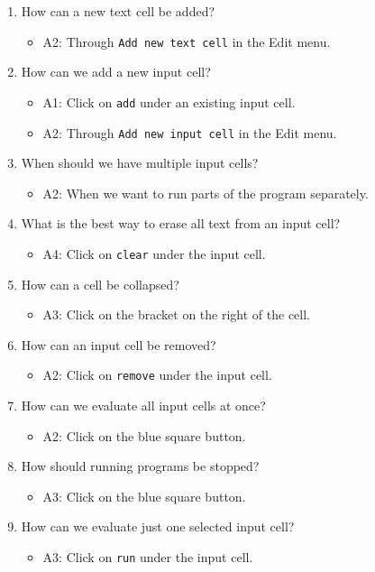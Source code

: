 \documentclass[article,A4,12pt]{llncs}
\begin{document}
\begin{enumerate}
\item How can a new text cell be added?
  \begin{itemize}
    \item A2: Through {\tt Add new text cell} in the Edit menu.
  \end{itemize}
\item How can we add a new input cell?
  \begin{itemize}
    \item A1: Click on {\tt add} under an existing input cell.
    \item A2: Through {\tt Add new input cell} in the Edit menu.
  \end{itemize}
\item When should we have multiple input cells?
  \begin{itemize}
    \item A2: When we want to run parts of the program separately.
  \end{itemize}
\item What is the best way to erase all text from an input cell?
  \begin{itemize}
    \item A4: Click on {\tt clear} under the input cell.
  \end{itemize}
\item How can a cell be collapsed?
  \begin{itemize}
    \item A3: Click on the bracket on the right of the cell.
  \end{itemize}
\item How can an input cell be removed?
  \begin{itemize}
    \item A2: Click on {\tt remove} under the input cell.
  \end{itemize}
\item How can we evaluate all input cells at once?
  \begin{itemize}
    \item A2: Click on the blue square button.
  \end{itemize}
\item How should running programs be stopped?
  \begin{itemize}
    \item A3: Click on the blue square button.
  \end{itemize}
\item How can we evaluate just one selected input cell?
  \begin{itemize}
    \item A3: Click on {\tt run} under the input cell.
  \end{itemize}
\end{enumerate}
\end{document}
